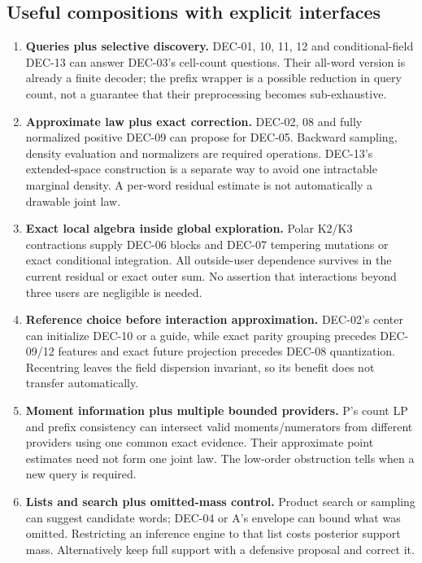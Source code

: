 \documentclass[10pt,a4paper]{article}
\begin{document}
\subsection{Useful compositions with explicit interfaces}
\begin{enumerate}
\item \textbf{Queries plus selective discovery.}
      DEC-01, 10, 11, 12 and conditional-field DEC-13 can answer DEC-03's cell-count questions.
      Their all-word version is already a finite decoder; the prefix wrapper is a possible reduction in
      query count, not a guarantee that their preprocessing becomes sub-exhaustive.
\item \textbf{Approximate law plus exact correction.}
      DEC-02, 08 and fully normalized positive DEC-09 can propose for DEC-05.
      Backward sampling, density evaluation and normalizers are required operations.
      DEC-13's extended-space construction is a separate way to avoid one intractable marginal density.
      A per-word residual estimate is not automatically a drawable joint law.
\item \textbf{Exact local algebra inside global exploration.}
      Polar K2/K3 contractions supply DEC-06 blocks and DEC-07 tempering mutations or exact conditional
      integration. All outside-user dependence survives in the current residual or exact outer sum.
      No assertion that interactions beyond three users are negligible is needed.
\item \textbf{Reference choice before interaction approximation.}
      DEC-02's center can initialize DEC-10 or a guide, while exact parity grouping precedes DEC-09/12
      features and exact future projection precedes DEC-08 quantization.
      Recentring leaves the field dispersion invariant, so its benefit does not transfer automatically.
\item \textbf{Moment information plus multiple bounded providers.}
      P's count LP and prefix consistency can intersect valid moments/numerators from different
      providers using one common exact evidence. Their approximate point estimates need not form one
      joint law. The low-order obstruction tells when a new query is required.
\item \textbf{Lists and search plus omitted-mass control.}
      Product search or sampling can suggest candidate words; DEC-04 or A's envelope can bound what was
      omitted. Restricting an inference engine to that list costs posterior support mass.
      Alternatively keep full support with a defensive proposal and correct it.
\end{enumerate}
\end{document}
